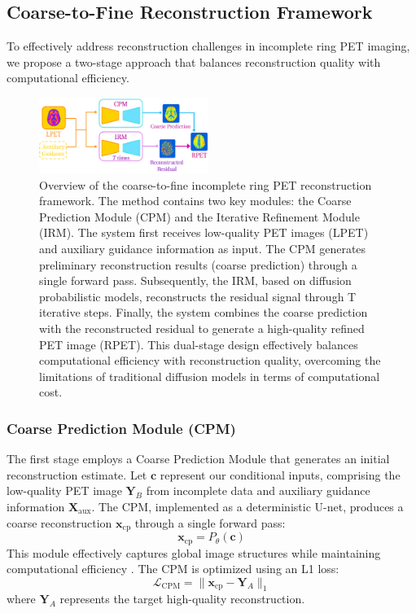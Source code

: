 \documentclass[
reprint,
superscriptaddress,
nofootinbib,
amsmath,amssymb,
aps,
prd,
]{revtex4-2}
\begin{document}
\subsection{Coarse-to-Fine Reconstruction Framework}

To effectively address reconstruction challenges in incomplete ring PET imaging, we propose a two-stage approach that balances reconstruction quality with computational efficiency.
\begin{figure}[ht]
    \centering
    \includegraphics[width=0.49\textwidth]{Images/C2F.png}
    \caption{Overview of the coarse-to-fine incomplete ring PET reconstruction framework. The method contains two key modules: the Coarse Prediction Module (CPM) and the Iterative Refinement Module (IRM). The system first receives low-quality PET images (LPET) and auxiliary guidance information as input. The CPM generates preliminary reconstruction results (coarse prediction) through a single forward pass. Subsequently, the IRM, based on diffusion probabilistic models, reconstructs the residual signal through T iterative steps. Finally, the system combines the coarse prediction with the reconstructed residual to generate a high-quality refined PET image (RPET). This dual-stage design effectively balances computational efficiency with reconstruction quality, overcoming the limitations of traditional diffusion models in terms of computational cost.}
    \label{fig:coarse_to_fine_framework}
\end{figure}

\subsubsection{Coarse Prediction Module (CPM)}
The first stage employs a Coarse Prediction Module that generates an initial reconstruction estimate. Let \(\mathbf{c}\) represent our conditional inputs, comprising the low-quality PET image \(\mathbf{Y}_B\) from incomplete data and auxiliary guidance information \(\mathbf{X}_{\text{aux}}\). The CPM, implemented as a deterministic U-net, produces a coarse reconstruction \(\mathbf{x}_\text{cp}\) through a single forward pass:
\begin{equation}
\mathbf{x}_\text{cp} = P_\theta(\mathbf{c})
\end{equation}
This module effectively captures global image structures while maintaining computational efficiency \cite{saharia2023}. The CPM is optimized using an L1 loss:
\begin{equation}
\mathcal{L}_{\text{CPM}} = \|\mathbf{x}_\text{cp} - \mathbf{Y}_A\|_1
\end{equation}
where \(\mathbf{Y}_A\) represents the target high-quality reconstruction.
\end{document}

